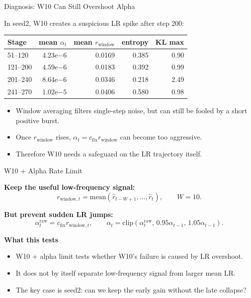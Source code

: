 \documentclass[aspectratio=169]{beamer}
\begin{document}
\begin{frame}{Diagnosis: W10 Can Still Overshoot Alpha}
\small

In seed2, W10 creates a suspicious LR spike after step 200:

\begin{center}
\scriptsize
\begin{tabular}{lrrrr}
\toprule
Stage & mean \(\alpha_t\) & mean \(r_{\mathrm{window}}\) & entropy & KL max \\
\midrule
51--120 & \(4.23\mathrm{e}{-6}\) & 0.0169 & 0.385 & 0.90 \\
121--200 & \(4.59\mathrm{e}{-6}\) & 0.0183 & 0.392 & 0.99 \\
201--240 & \(8.64\mathrm{e}{-6}\) & 0.0346 & 0.218 & 2.49 \\
241--270 & \(1.02\mathrm{e}{-5}\) & 0.0406 & 0.580 & 0.98 \\
\bottomrule
\end{tabular}
\end{center}

\vspace{0.6em}

\begin{itemize}
  \item Window averaging filters single-step noise, but can still be fooled by a short positive burst.
  \item Once \(r_{\mathrm{window}}\) rises, \(\alpha_t=c_{\mathrm{fix}}r_{\mathrm{window}}\) can become too aggressive.
  \item Therefore W10 needs a safeguard on the LR trajectory itself.
\end{itemize}

\end{frame}

\begin{frame}{W10 + Alpha Rate Limit}
\small

\textbf{Keep the useful low-frequency signal:}
\[
  r_{\mathrm{window},t}
  =
  \mathrm{mean}
  \left(
    \hat r_{t-W+1},\ldots,\hat r_t
  \right),
  \qquad
  W=10.
\]

\vspace{0.6em}

\textbf{But prevent sudden LR jumps:}
\[
  \alpha^{\mathrm{raw}}_t
  =
  c_{\mathrm{fix}}r_{\mathrm{window},t},
  \qquad
  \alpha_t
  =
  \mathrm{clip}
  \left(
    \alpha^{\mathrm{raw}}_t,\,
    0.95\alpha_{t-1},\,
    1.05\alpha_{t-1}
  \right).
\]

\vspace{0.8em}

\textbf{What this tests}

\begin{itemize}
  \item W10 + alpha limit tests whether W10's failure is caused by LR overshoot.
  \item It does not by itself separate low-frequency signal from larger mean LR.
  \item The key case is seed2: can we keep the early gain without the late collapse?
\end{itemize}

\end{frame}
\end{document}

